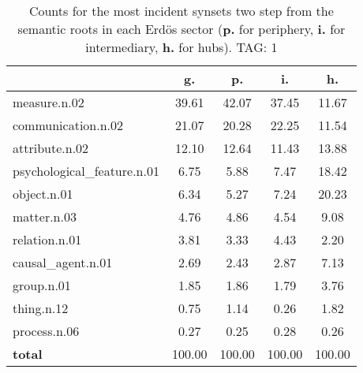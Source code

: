 \begin{table}[h!]
\begin{center}
\begin{tabular}{| l || c | c | c | c |}\hline
 & {\bf g.} & {\bf p.} & {\bf i.} & {\bf h.} \\\hline\hline
measure.n.02 & 39.61  & 42.07  & 37.45  & 11.67 \\\hline
communication.n.02 & 21.07  & 20.28  & 22.25  & 11.54 \\\hline
attribute.n.02 & 12.10  & 12.64  & 11.43  & 13.88 \\\hline
psychological\_feature.n.01 & 6.75  & 5.88  & 7.47  & 18.42 \\\hline
object.n.01 & 6.34  & 5.27  & 7.24  & 20.23 \\\hline
matter.n.03 & 4.76  & 4.86  & 4.54  & 9.08 \\\hline
relation.n.01 & 3.81  & 3.33  & 4.43  & 2.20 \\\hline
causal\_agent.n.01 & 2.69  & 2.43  & 2.87  & 7.13 \\\hline
group.n.01 & 1.85  & 1.86  & 1.79  & 3.76 \\\hline
thing.n.12 & 0.75  & 1.14  & 0.26  & 1.82 \\\hline
process.n.06 & 0.27  & 0.25  & 0.28  & 0.26 \\\hline\hline
{{\bf total}} & 100.00  & 100.00  & 100.00  & 100.00 \\\hline
\end{tabular}
\caption{Counts for the most incident synsets two step from the semantic roots in each Erd\"os sector ({\bf p.} for periphery, {\bf i.} for intermediary, {\bf h.} for hubs). TAG: 1}
\end{center}
\end{table}